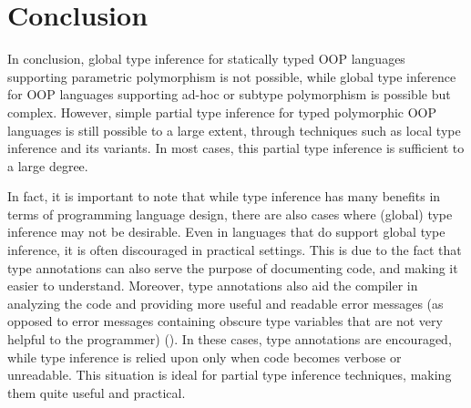 \section{Conclusion}

In conclusion, global type inference for statically typed OOP languages supporting parametric polymorphism is not possible, while global type inference for OOP languages supporting ad-hoc or subtype polymorphism is possible but complex. However, simple partial type inference for typed polymorphic OOP languages is still possible to a large extent, through techniques such as local type inference and its variants. In most cases, this partial type inference is sufficient to a large degree.

In fact, it is important to note that while type inference has many benefits in terms of programming language design, there are also cases where (global) type inference may not be desirable. Even in languages that do support global type inference, it is often discouraged in practical settings. This is due to the fact that type annotations can also serve the purpose of documenting code, and making it easier to understand. Moreover, type annotations also aid the compiler in analyzing the code and providing more useful and readable error messages (as opposed to error messages containing obscure type variables that are not very helpful to the programmer) (\cite{pierceturner}). In these cases, type annotations are encouraged, while type inference is relied upon only when code becomes verbose or unreadable. This situation is ideal for partial type inference techniques, making them quite useful and practical.
